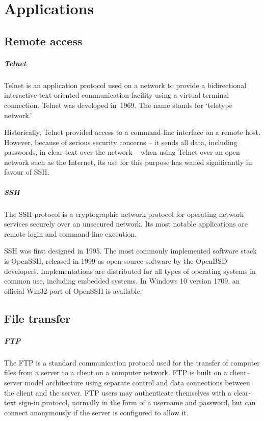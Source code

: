 \chapter{Applications}
\label{chap:applications}

\section{Remote access}

\paragraph{Telnet}
Telnet is an application protocol used on a network to provide a bidirectional interactive text-oriented communication facility using a virtual terminal connection.
Telnet was developed in~1969.
The name stands for `teletype network.'

Historically, Telnet provided access to a command-line interface on a remote host.
However, because of serious security concerns -- it sends all data, including passwords, in clear-text over the network -- when using Telnet over an open network such as the Internet, its use for this purpose has waned significantly in favour of \acs{SSH}.

\paragraph{\acs{SSH}}
The \acf{SSH} protocol is a cryptographic network protocol for operating network services securely over an unsecured network.
Its most notable applications are remote login and command-line execution.

\acs{SSH} was first designed in 1995.
The most commonly implemented software stack is OpenSSH, released in 1999 as open-source software by the OpenBSD developers.
Implementations are distributed for all types of operating systems in common use, including embedded systems.
In Windows 10 version 1709, an official Win32 port of OpenSSH is available.

\section{File transfer}

\paragraph{\acs{FTP}}
The \acf{FTP} is a standard communication protocol used for the transfer of computer files from a server to a client on a computer network.
\acs{FTP} is built on a client–server model architecture using separate control and data connections between the client and the server.
\acs{FTP} users may authenticate themselves with a clear-text sign-in protocol, normally in the form of a username and password, but can connect anonymously if the server is configured to allow it.

